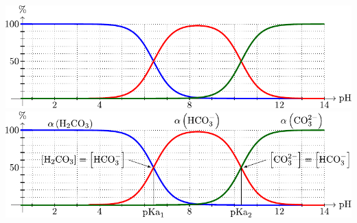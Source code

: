 \documentclass[../../main/main.tex]{subfiles}
\begin{document}
\begin{tcb*}[breakable]
\begin{itemize}
\begin{center}
{				\includegraphics[scale=1]{distrib_carbo-plain}
			}{
				\includegraphics[scale=1]{distrib_carbo}
			}
		\end{center}
	\end{itemize}
\end{tcb*}
\end{document}
